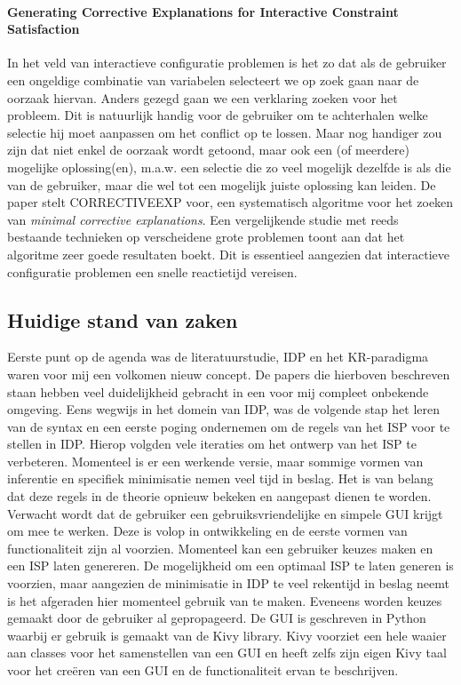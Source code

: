 \paragraph{Generating Corrective Explanations for Interactive Constraint Satisfaction \cite{ocallaghan05}}
In het veld van interactieve configuratie problemen is het zo dat als de gebruiker een ongeldige combinatie van variabelen selecteert we op zoek gaan naar de oorzaak hiervan. Anders gezegd gaan we een verklaring zoeken voor het probleem. Dit is natuurlijk handig voor de gebruiker om te achterhalen welke selectie hij moet aanpassen om het conflict op te lossen. Maar nog handiger zou zijn dat niet enkel de oorzaak wordt getoond, maar ook een (of meerdere) mogelijke oplossing(en), m.a.w. een selectie die zo veel mogelijk dezelfde is als die van de gebruiker, maar die wel tot een mogelijk juiste oplossing kan leiden. De paper stelt CORRECTIVEEXP voor, een systematisch algoritme voor het zoeken van \emph{minimal corrective explanations}. Een vergelijkende studie met reeds bestaande technieken op verscheidene grote problemen toont aan dat het algoritme zeer goede resultaten boekt. Dit is essentieel aangezien dat interactieve configuratie problemen een snelle reactietijd vereisen.


\subsection{Huidige stand van zaken}

Eerste punt op de agenda was de literatuurstudie, IDP en het KR-paradigma waren voor mij een volkomen nieuw concept. De papers die hierboven beschreven staan hebben veel duidelijkheid gebracht in een voor mij compleet onbekende omgeving. 
Eens wegwijs in het domein van IDP, was de volgende stap het leren van de syntax en een eerste poging ondernemen om de regels van het ISP voor te stellen in IDP. Hierop volgden vele iteraties om het ontwerp van het ISP te verbeteren. Momenteel is er een werkende versie, maar sommige vormen van inferentie en specifiek minimisatie nemen veel tijd in beslag. Het is van belang dat deze regels in de theorie opnieuw bekeken en aangepast dienen te worden. Verwacht wordt dat de gebruiker een gebruiksvriendelijke en simpele GUI krijgt om mee te werken. Deze is volop in ontwikkeling en de eerste vormen van functionaliteit zijn al voorzien. Momenteel kan een gebruiker keuzes maken en een ISP laten genereren. De mogelijkheid om een optimaal ISP te laten generen is voorzien, maar aangezien de minimisatie in IDP te veel rekentijd in beslag neemt is het afgeraden hier momenteel gebruik van te maken. Eveneens worden keuzes gemaakt door de gebruiker al gepropageerd. De GUI is geschreven in Python waarbij er gebruik is gemaakt van de Kivy library. Kivy voorziet een hele waaier aan classes voor het samenstellen van een GUI en heeft zelfs zijn eigen Kivy taal voor het cre\"{e}ren van een GUI en de functionaliteit ervan te beschrijven. 